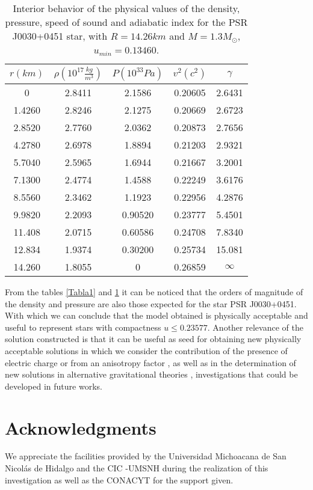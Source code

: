 \documentclass[12pt,onecolumn,a4paper]{article}
\begin{document}
\begin{table}[h]
\caption{Interior behavior of the physical values of the density, pressure, speed of sound and adiabatic index for the  PSR J0030+0451 star, with  $R=14.26 km$ and $M=1.3 M_\odot$, $u_{min}= 0.13460$.}
{ \begin{tabular}{|c|c|c|c|c|}
\hline
$r(km)$&$\!\!\rho\left(10^{17}\frac{kg}{m^3}\right)\!\!\!$&$\! P(10^{33} Pa)$ & $v^2(c^2)$& $\gamma$  \\ \hline 
    0  &  2.8411 &  2.1586 &  0.20605 &  2.6431  \\  \hline
1.4260 &  2.8246 &  2.1275 &  0.20669 &  2.6723  \\  \hline
2.8520 &  2.7760 &  2.0362 &  0.20873 &  2.7656  \\  \hline
4.2780 &  2.6978 &  1.8894 &  0.21203 &  2.9321  \\  \hline
5.7040 &  2.5965 &  1.6944 &  0.21667 &  3.2001  \\  \hline
7.1300 &  2.4774 &  1.4588 &  0.22249 &  3.6176  \\  \hline
8.5560 &  2.3462 &  1.1923 &  0.22956 &  4.2876  \\  \hline
9.9820 &  2.2093 &  0.90520 &  0.23777 &  5.4501  \\  \hline
11.408 &  2.0715 &  0.60586 &  0.24708 &  7.8340  \\  \hline
12.834 &  1.9374 &  0.30200 &  0.25734 &  15.081  \\  \hline
14.260 &  1.8055 &  0       &  0.26859 & $\infty$ \\  \hline
\end{tabular} }
\label{Tabla2}
\end{table}
From the tables  \ref{Tabla1} and \ref{Tabla2} it can be noticed that the orders of magnitude of the density and pressure are also those expected for the star  PSR  J0030+0451. With which we can conclude that the model obtained is physically acceptable and useful to represent stars with compactness $u\leq 0.23577$. Another relevance of the solution constructed is that it can be useful as seed for obtaining new physically acceptable solutions \cite{Boonserm} in which we consider the contribution of the presence of electric charge \cite{carga} or from an anisotropy factor \cite{Ovalle4}, as well as in the determination of new solutions in alternative gravitational theories \cite{alternativas}, investigations that could be developed in future works. 



  \newpage
\section*{Acknowledgments} 
We appreciate the facilities provided by the Universidad Michoacana de San Nicolás de Hidalgo and the CIC -UMSNH during the realization of this investigation as well as the CONACYT for the support given.
\end{document}
